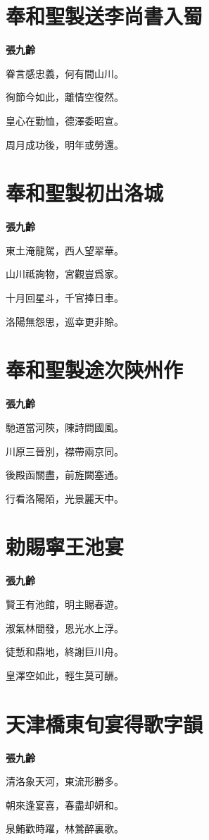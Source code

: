 \documentclass[12pt,a4paper]{ctexbook}
\begin{document}
\section{奉和聖製送李尚書入蜀}
\textbf{張九齡}\par\vspace{0.5em}
眷言感忠義，何有間山川。\par
徇節今如此，離情空復然。\par
皇心在勤恤，德澤委昭宣。\par
周月成功後，明年或勞還。\par

\section{奉和聖製初出洛城}
\textbf{張九齡}\par\vspace{0.5em}
東土淹龍駕，西人望翠華。\par
山川祗詢物，宮觀豈爲家。\par
十月回星斗，千官捧日車。\par
洛陽無怨思，巡幸更非賒。\par

\section{奉和聖製途次陝州作}
\textbf{張九齡}\par\vspace{0.5em}
馳道當河陝，陳詩問國風。\par
川原三晉別，襟帶兩京同。\par
後殿函關盡，前旌闕塞通。\par
行看洛陽陌，光景麗天中。\par

\section{勅賜寧王池宴}
\textbf{張九齡}\par\vspace{0.5em}
賢王有池館，明主賜春遊。\par
淑氣林間發，恩光水上浮。\par
徒慙和鼎地，終謝巨川舟。\par
皇澤空如此，輕生莫可酬。\par

\section{天津橋東旬宴得歌字韻}
\textbf{張九齡}\par\vspace{0.5em}
清洛象天河，東流形勝多。\par
朝來逢宴喜，春盡却妍和。\par
泉鮪歡時躍，林鶯醉裏歌。\par
\end{document}

